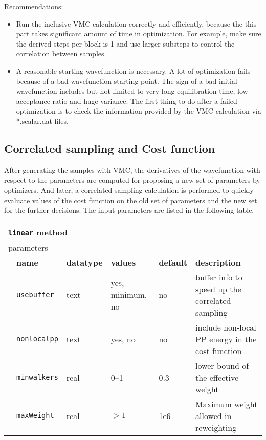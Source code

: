 Recommendations:
\begin{itemize}
\item Run the inclusive VMC calculation correctly and efficiently, because the this part takes significant amount of time in optimization.
For example, make sure the derived steps per block is 1 and use larger substeps to control the correlation between samples.
\item A reasonable starting wavefunction is necessary. A lot of optimization fails because of a bad wavefunction starting point.
The sign of a bad initial wavefunction includes but not limited to very long equilibration time, low acceptance ratio and huge variance.
The first thing to do after a failed optimization is to check the information provided by the VMC calculation via *.scalar.dat files.
\end{itemize}

\subsection{Correlated sampling and Cost function}
After generating the samples with VMC, the derivatives of the wavefunction with respect to the parameters are computed for proposing a new set of parameters by optimizers.
And later, a correlated sampling calculation is performed to quickly evaluate values of the cost function on the old set of parameters and the new set for the further decisions.
The input parameters are listed in the following table.
\begin{table}[h]
\begin{center}
\begin{tabularx}{\textwidth}{l l l l l l }
\hline
\multicolumn{6}{l}{\texttt{linear} method} \\
\hline
\multicolumn{2}{l}{parameters}  & \multicolumn{4}{l}{}\\
   &   \bfseries name     & \bfseries datatype & \bfseries values & \bfseries default   & \bfseries description \\
   &   \texttt{usebuffer} &  text     & yes, minimum, no & no  & buffer info to speed up the correlated sampling\\
   &   \texttt{nonlocalpp} &  text     & yes, no & no  & include non-local PP energy in the cost function\\
   &   \texttt{minwalkers} &  real     & 0--1   & 0.3 & lower bound of the effective weight\\
   &   \texttt{maxWeight} &  real     & $>1$   & 1e6 & Maximum weight allowed in reweighting\\
  \hline
\end{tabularx}
\end{center}
\end{table}

